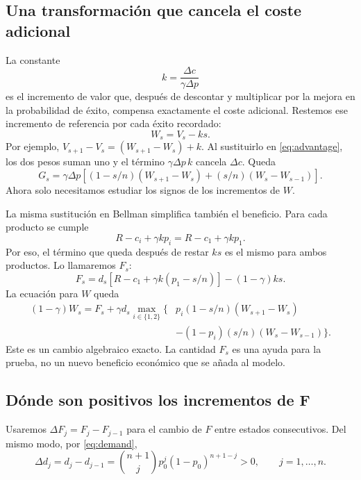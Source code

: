 \documentclass[11pt,a4paper]{article}
\begin{document}
\subsection{Una transformación que cancela el coste adicional}

La constante
\[
k=\frac{\Delta c}{\gamma\Delta p}
\]
es el incremento de valor que, después de descontar y multiplicar por
la mejora en la probabilidad de éxito, compensa exactamente el coste
adicional. Restemos ese incremento de referencia por cada éxito
recordado:
\begin{equation}
W_s=V_s-ks.
\label{eq:transform}
\end{equation}
Por ejemplo, $V_{s+1}-V_s=(W_{s+1}-W_s)+k$. Al sustituirlo en
\eqref{eq:advantage}, los dos pesos suman uno y el término
$\gamma\Delta p\,k$ cancela $\Delta c$. Queda
\begin{equation}
G_s=\gamma\Delta p
\left[(1-s/n)(W_{s+1}-W_s)+(s/n)(W_s-W_{s-1})\right].
\label{eq:advantage-transformed}
\end{equation}
Ahora solo necesitamos estudiar los signos de los incrementos de $W$.

La misma sustitución en Bellman simplifica también el beneficio.
Para cada producto se cumple
\[
R-c_i+\gamma k p_i=R-c_1+\gamma k p_1.
\]
Por eso, el término que queda después de restar $ks$ es el mismo
para ambos productos. Lo llamaremos $F_s$:
\begin{equation}
F_s=d_s\left[R-c_1+\gamma k(p_1-s/n)\right]
       -(1-\gamma)ks.
\label{eq:transformed-reward}
\end{equation}
La ecuación para $W$ queda
\begin{equation}
\begin{aligned}
(1-\gamma)W_s=F_s+\gamma d_s\max_{i\in\{1,2\}}\biggl\{
&p_i(1-s/n)(W_{s+1}-W_s)\\
&-(1-p_i)(s/n)(W_s-W_{s-1})\biggr\}.
\end{aligned}
\label{eq:transformed-bellman}
\end{equation}
Este es un cambio algebraico exacto. La cantidad $F_s$ es una ayuda
para la prueba, no un nuevo beneficio económico que se añada al modelo.

\subsection{Dónde son positivos los incrementos de F}
\label{sec:signos-F}

Usaremos $\Delta F_j=F_j-F_{j-1}$ para el cambio de $F$ entre estados
consecutivos. Del mismo modo, por \eqref{eq:demand},
\begin{equation}
\Delta d_j=d_j-d_{j-1}
 =\binom{n+1}{j}p_0^j(1-p_0)^{n+1-j}>0,
\qquad j=1,\ldots,n.
\label{eq:delta-demand}
\end{equation}
\end{document}
